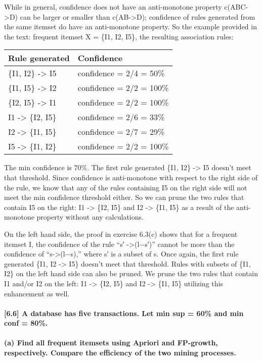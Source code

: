 \documentclass[11pt]{article}
\begin{document}
While in general, confidence does not have an anti-monotone property
c(ABC-\textgreater{}D) can be larger or smaller than
c(AB-\textgreater{}D); confidence of rules generated from the same
itemset do have an anti-monotone property. So the example provided in
the text: frequent itemset X = \{I1, I2, I5\}, the resulting association
rules:

\begin{longtable}[]{@{}ll@{}}
\toprule
Rule generated & Confidence\tabularnewline
\midrule
\endhead
\{I1, I2\} -\textgreater{} I5 & confidence = 2/4 = 50\%\tabularnewline
\{I1, I5\} -\textgreater{} I2 & confidence = 2/2 = 100\%\tabularnewline
\{I2, I5\} -\textgreater{} I1 & confidence = 2/2 = 100\%\tabularnewline
I1 -\textgreater{} \{I2, I5\} & confidence = 2/6 = 33\%\tabularnewline
I2 -\textgreater{} \{I1, I5\} & confidence = 2/7 = 29\%\tabularnewline
I5 -\textgreater{} \{I1, I2\} & confidence = 2/2 = 100\%\tabularnewline
\bottomrule
\end{longtable}

The min confidence is 70\%. The first rule generated \{I1, I2\}
-\textgreater{} I5 doesn't meet that threshold. Since confidence is
anti-monotone with respect to the right side of the rule, we know that
any of the rules containing I5 on the right side will not meet the min
confidence threshold either. So we can prune the two rules that contain
I5 on the right: I1 -\textgreater{} \{I2, I5\} and I2 -\textgreater{}
\{I1, I5\} as a result of the anti-monotone property without any
calculations.

On the left hand side, the proof in exercise 6.3(c) shows that for a
frequent itemset I, the confidence of the rule ``s′
-\textgreater{}(l−s′)'' cannot be more than the confidence of
``s-\textgreater{}(l−s),'' where s′ is a subset of s. Once again, the
first rule generated \{I1, I2 -\textgreater{} I5\} doesn't meet that
threshold. Rules with subsets of \{I1, I2\} on the left hand side can
also be pruned. We prune the two rules that contain I1 and/or I2 on the
left: I1 -\textgreater{} \{I2, I5\} and I2 -\textgreater{} \{I1, I5\}
utilizing this enhancement as well.

    \paragraph{{[}6.6{]} A database has five transactions. Let min sup =
60\% and min conf =
80\%.}\label{a-database-has-five-transactions.-let-min-sup-60-and-min-conf-80.}

    \paragraph{(a) Find all frequent itemsets using Apriori and FP-growth,
respectively. Compare the efficiency of the two mining
processes.}\label{a-find-all-frequent-itemsets-using-apriori-and-fp-growth-respectively.-compare-the-efficiency-of-the-two-mining-processes.}
\end{document}
